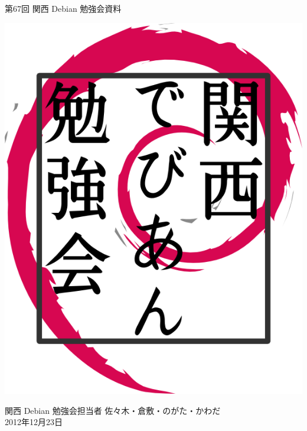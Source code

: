 \documentclass[mingoth,a4paper]{jsarticle}
\newcommand{\debmtgyear}{2012}
\newcommand{\debmtgdate}{23}
\newcommand{\debmtgmonth}{12}
\newcommand{\debmtgnumber}{67}
\begin{document}
\begin{titlepage}


 第\debmtgnumber{}回 関西 Debian 勉強会資料

\vspace{2cm}

\begin{center}
\includegraphics{image200802/kansaidebianlogo.png}
\end{center}

\begin{flushright}
\hfill{}関西 Debian 勉強会担当者 佐々木・倉敷・のがた・かわだ \\
\hfill{}\debmtgyear{}年\debmtgmonth{}月\debmtgdate{}日
\end{flushright}

\thispagestyle{empty}
\end{titlepage}


\vspace{1em}
\end{document}
